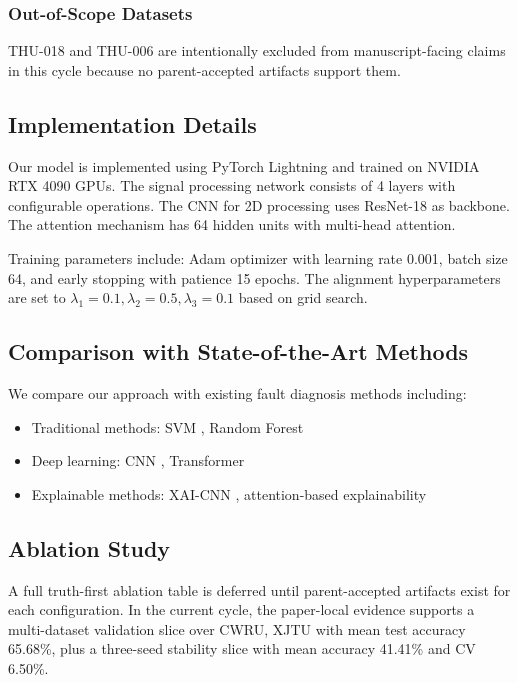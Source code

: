 \documentclass[journal]{IEEEtran}
\begin{document}
\subsubsection{Out-of-Scope Datasets}
THU-018 and THU-006 are intentionally excluded from manuscript-facing claims in this cycle because no parent-accepted artifacts support them.

\subsection{Implementation Details}

Our model is implemented using PyTorch Lightning \cite{falcon2019pytorch} and trained on NVIDIA RTX 4090 GPUs. The signal processing network consists of 4 layers with configurable operations. The CNN for 2D processing uses ResNet-18 as backbone. The attention mechanism has 64 hidden units with multi-head attention.

Training parameters include: Adam optimizer with learning rate 0.001, batch size 64, and early stopping with patience 15 epochs. The alignment hyperparameters are set to $\lambda_1 = 0.1, \lambda_2 = 0.5, \lambda_3 = 0.1$ based on grid search.

\subsection{Comparison with State-of-the-Art Methods}

We compare our approach with existing fault diagnosis methods including:

\begin{itemize}
\item Traditional methods: SVM \cite{support}, Random Forest \cite{breiman2001random}
\item Deep learning: CNN \cite{zhang2020intelligent}, Transformer \cite{zhu2022transformer}
\item Explainable methods: XAI-CNN \cite{li2021explainable}, attention-based explainability \cite{zhang2022explainable}
\end{itemize}

\subsection{Ablation Study}

A full truth-first ablation table is deferred until parent-accepted artifacts exist for each configuration. In the current cycle, the paper-local evidence supports a multi-dataset validation slice over CWRU, XJTU with mean test accuracy 65.68\%, plus a three-seed stability slice with mean accuracy 41.41\% and CV 6.50\%.
\end{document}
